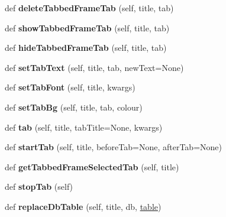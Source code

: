 \begin{DoxyCompactItemize}
\item 
\mbox{\label{classappjar_1_1gui_ade6eb1fddfa296d83f7cab632570cfe7}} 
def {\bfseries delete\+Tabbed\+Frame\+Tab} (self, title, tab)
\item 
\mbox{\label{classappjar_1_1gui_afa780aef0d8e311f6ff58336fc196bfe}} 
def {\bfseries show\+Tabbed\+Frame\+Tab} (self, title, tab)
\item 
\mbox{\label{classappjar_1_1gui_aa02014d0239f889a3e62b9dae1c18f04}} 
def {\bfseries hide\+Tabbed\+Frame\+Tab} (self, title, tab)
\item 
\mbox{\label{classappjar_1_1gui_a6b0c352bb970824efeef3f0ebaffe592}} 
def {\bfseries set\+Tab\+Text} (self, title, tab, new\+Text=None)
\item 
\mbox{\label{classappjar_1_1gui_a6b01806fd6593c9bd1f8f2986deed83d}} 
def {\bfseries set\+Tab\+Font} (self, title, kwargs)
\item 
\mbox{\label{classappjar_1_1gui_a8d23c1c989a8d019062bd3f6d8be1392}} 
def {\bfseries set\+Tab\+Bg} (self, title, tab, colour)
\item 
\mbox{\label{classappjar_1_1gui_ad897f483592a16fb8afc27ffc8cfdbb7}} 
def {\bfseries tab} (self, title, tab\+Title=None, kwargs)
\item 
\mbox{\label{classappjar_1_1gui_aca548804eb60fb65241be5229865c0c5}} 
def {\bfseries start\+Tab} (self, title, before\+Tab=None, after\+Tab=None)
\item 
\mbox{\label{classappjar_1_1gui_ad544aa303afea1c19f352bd18d9469cd}} 
def {\bfseries get\+Tabbed\+Frame\+Selected\+Tab} (self, title)
\item 
\mbox{\label{classappjar_1_1gui_a116d4cdcd65ce985579a238ce597aca7}} 
def {\bfseries stop\+Tab} (self)
\item 
\mbox{\label{classappjar_1_1gui_a362d602ea52c616d8a0d393f64da387a}} 
def {\bfseries replace\+Db\+Table} (self, title, db, \hyperlink{classappjar_1_1gui_a137fe094086a1e996bdbcb8bb56c20ae}{table})

\end{DoxyCompactItemize}
